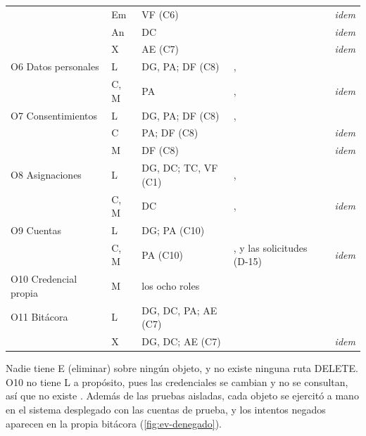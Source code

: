 \documentclass[11pt,a4paper]{article}
\theoremstyle{definition}
\theoremstyle{remark}
\begin{document}
{\begin{xltabular}{\linewidth}{@{}P{1.9cm}P{0.6cm}P{3.4cm}YP{3.0cm}@{}}
 & Em & VF (C6) &  & \textit{idem}\\
 & An & DC &  & \textit{idem}\\
 & X & AE (C7) &  & \textit{idem}\\
\addlinespace
O6 Datos personales & L & DG, PA; DF (C8) & ,  & \\
 & C, M & PA & ,  & \textit{idem}\\
\addlinespace
O7 Consenti\-mientos & L & DG, PA; DF (C8) & ,  & \\
 & C & PA; DF (C8) &  & \textit{idem}\\
 & M & DF (C8) &  & \textit{idem}\\
\addlinespace
O8 Asignaciones & L & DG, DC; TC, VF (C1) & ,  & \\
 & C, M & DC & ,  & \textit{idem}\\
\addlinespace
O9 Cuentas & L & DG; PA (C10) &  & \\
 & C, M & PA (C10) & ,  y las solicitudes (D-15) & \textit{idem}\\
\addlinespace
O10 Credencial propia & M & los ocho roles &  & \\
\addlinespace
O11 Bit\'acora & L & DG, DC, PA; AE (C7) &  & \\
 & X & DG, DC; AE (C7) &  & \textit{idem}\\
\end{xltabular}
}

Nadie tiene E (eliminar) sobre ning\'un objeto, y no existe ninguna ruta
DELETE. O10 no tiene L a prop\'osito, pues las credenciales se cambian y no se
consultan, as\'i que no existe . Adem\'as de las
pruebas aisladas, cada objeto se ejercit\'o a mano en el sistema desplegado con las
cuentas de prueba, y los intentos negados aparecen en la propia bit\'acora
(\cref{fig:ev-denegado}).

%
\end{document}
